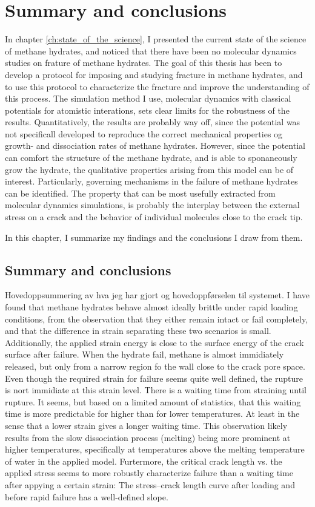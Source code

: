 \chapter{Summary and conclusions}
\label{ch:summary_conclusions}
In chapter \ref{ch:state_of_the_science}, I presented the current state of the science of methane hydrates, and noticed that there have been no molecular dynamics studies on frature of methane hydrates. The goal of this thesis has been to develop a protocol for imposing and studying fracture in methane hydrates, and to use this protocol to characterize the fracture and improve the understanding of this process. The simulation method I use, molecular dynamics with classical potentials for atomistic interations, sets clear limits for the robustness of the results. Quantitatively, the results are probably way off, since the potential was not specificall developed to reproduce the correct mechanical properties og growth- and dissociation rates of methane hydrates. However, since the potential can comfort the structure of the methane hydrate, and is able to sponaneously grow the hydrate, the qualitative properties arising from this model can be of interest. Particularly, governing mechanisms in the failure of methane hydrates can be identified. The property that can be most usefully extracted from molecular dynamics simulations, is probably the interplay between the external stress on a crack and the behavior of individual molecules close to the crack tip. 

In this chapter, I summarize my findings and the conclusions I draw from them.

\section{Summary and conclusions}
Hovedoppsummering av hva jeg har gjort og hovedoppførselen til systemet.
I have found that methane hydrates behave almost ideally brittle under rapid loading conditions, from the observation that they either remain intact or fail completely, and that the difference in strain separating these two scenarios is small. Additionally, the applied strain energy is close to the surface energy of the crack surface after failure. When the hydrate fail, methane is almost immidiately released, but only from a narrow region fo the wall close to the crack pore space. Even though the required strain for failure seems quite well defined, the rupture is nort immidiate at this strain level. There is a waiting time from straining until rupture. It seems, but based on a limited amount of statistics, that this waiting time is more predictable for higher than for lower temperatures. At least in the sense that a lower strain gives a longer waiting time. This observation likely results from the slow dissociation process (melting) being more prominent at higher temperatures, specifically at temperatures above the melting temperature of water in the applied model.  Furtermore, the critical crack length vs. the applied stress seems to more robustly characterize failure than a waiting time after appying a certain strain: The stress--crack length curve after loading and before rapid failure has a well-defined slope. 

